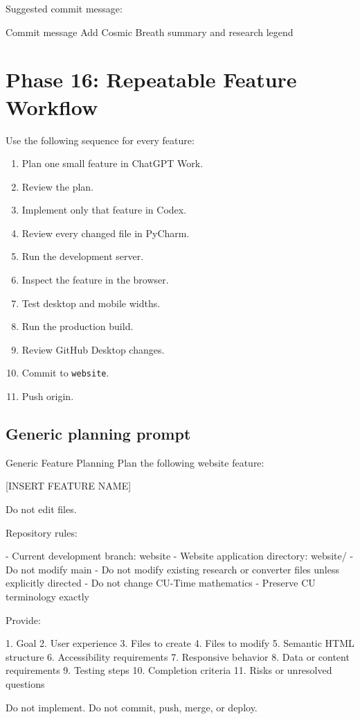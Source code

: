 \documentclass[11pt,letterpaper]{article}
\newcommand{\branchname}[1]{\texttt{#1}}
\begin{document}
Suggested commit message:

\begin{codebox}{Commit message}
Add Cosmic Breath summary and research legend
\end{codebox}

\section{Phase 16: Repeatable Feature Workflow}

Use the following sequence for every feature:

\begin{enumerate}
    \item Plan one small feature in ChatGPT Work.
    \item Review the plan.
    \item Implement only that feature in Codex.
    \item Review every changed file in PyCharm.
    \item Run the development server.
    \item Inspect the feature in the browser.
    \item Test desktop and mobile widths.
    \item Run the production build.
    \item Review GitHub Desktop changes.
    \item Commit to \branchname{website}.
    \item Push origin.
\end{enumerate}

\subsection{Generic planning prompt}

\begin{promptbox}{Generic Feature Planning}
Plan the following website feature:

[INSERT FEATURE NAME]

Do not edit files.

Repository rules:

- Current development branch: website
- Website application directory: website/
- Do not modify main
- Do not modify existing research or converter files unless
  explicitly directed
- Do not change CU-Time mathematics
- Preserve CU terminology exactly

Provide:

1. Goal
2. User experience
3. Files to create
4. Files to modify
5. Semantic HTML structure
6. Accessibility requirements
7. Responsive behavior
8. Data or content requirements
9. Testing steps
10. Completion criteria
11. Risks or unresolved questions

Do not implement.
Do not commit, push, merge, or deploy.
\end{promptbox}
\end{document}
